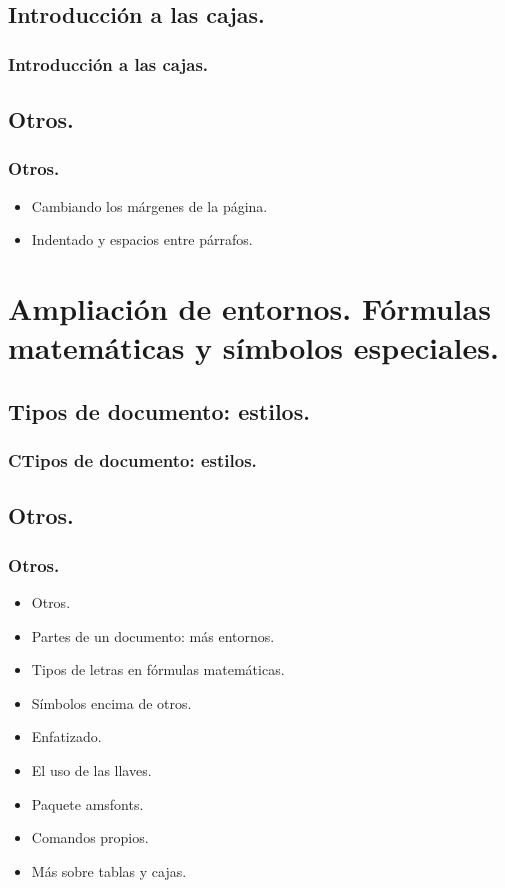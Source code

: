\documentclass{beamer}
\begin{document}
\subsection{Introducción a las cajas.}
\begin{frame}
  \frametitle{Introducción a las cajas.}
\end{frame}

\subsection{Otros.}
\begin{frame}
  \frametitle{Otros.}
  \begin{itemize}
  \item<1->{Cambiando los márgenes de la página.}
  \item<2->{Indentado y espacios entre párrafos.}
  \end{itemize}
\end{frame}

\section{Ampliación de entornos. Fórmulas matemáticas y símbolos especiales.}

\subsection{Tipos de documento: estilos.}
\begin{frame}
  \frametitle{CTipos de documento: estilos.}
\end{frame}

\subsection{Otros.}
\begin{frame}
  \frametitle{Otros.}
  \begin{itemize}
  \item<1->{Otros.}
  \item<2->{Partes de un documento: más entornos.}
  \item<3->{Tipos de letras en fórmulas matemáticas.}
  \item<4->{Símbolos encima de otros.}
  \item<5->{Enfatizado.}
  \item<6->{El uso de las llaves.}
  \item<7->{Paquete amsfonts.}
  \item<8->{Comandos propios.}
  \item<9->{Más sobre tablas y cajas.}
  \end{itemize}
\end{frame}
\end{document}
